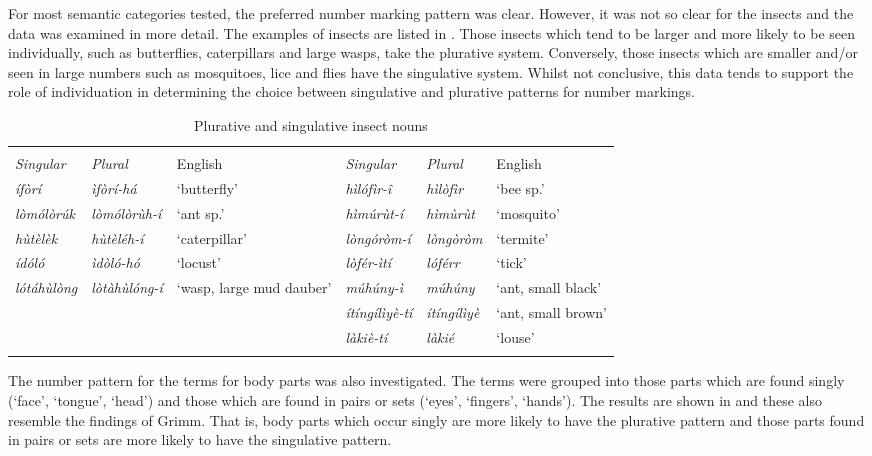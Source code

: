 \documentclass[output=paper]{langsci/langscibook}
\begin{document}
For most semantic categories tested, the preferred number marking pattern was clear. However, it was not so clear for the insects and the data was examined in more detail. The examples of insects are listed in . Those insects which tend to be larger and more likely to be seen individually, such as butterflies, caterpillars and large wasps, take the plurative system. Conversely, those insects which are smaller and/or seen in large numbers such as mosquitoes, lice and flies have the singulative system. Whilst not conclusive, this data tends to support the role of individuation in determining the choice between singulative and plurative patterns for number markings.

\begin{table}
\begin{tabularx}{\textwidth}{>{\itshape}l>{\itshape}lQ>{\itshape}l>{\itshape}lQ}
\lsptoprule

 & \\ \cmidrule(lr){1-3}\cmidrule(lr){4-6}
  \textup{Singular} &  \textup{Plural} &  {English} &  \textup{Singular} &  \textup{Plural} &  {English}\\
\midrule
 ífòrí &  ìfòrí-há & ‘butterfly’ &  hìlófìr-î &  hìlòfìr & ‘bee sp.’\\
\tablevspace
 lòmólòrúk &  lòmólòrùh-í & ‘ant sp.’ &  hìmúrùt-í &  hìmùrùt & ‘mosquito’\\
\tablevspace
 hùtèlèk &  hùtèléh-í & ‘caterpillar’ &  lòngóròm-í &  lòngòròm & ‘termite’\\
\tablevspace
 ídóló &  ìdòló-hó & ‘locust’ &  lòfér-ìtí &  lóférr & ‘tick’\\
\tablevspace
 lótáhùlòng &  lòtàhùlóng-í & ‘wasp, large mud dauber’ &  múhúny-ì &  múhúny & ‘ant, small black’\\
\tablevspace
&  &  &  ítíngílìyè-tí &  ítíngílìyè & ‘ant, small brown’\\
\tablevspace
&  &  &  làkiè-tí &  làkié & ‘louse’\\
\lspbottomrule
\end{tabularx}
\caption{Plurative and singulative insect nouns}
\label{tab:moodie:7}
\end{table}

The number pattern for the terms for body parts was also investigated. The terms were grouped into those parts which are found singly (‘face’, ‘tongue’, ‘head’) and those which are found in pairs or sets (‘eyes’, ‘fingers’, ‘hands’). The results are shown in  and these also resemble the findings of Grimm.  That is, body parts which occur singly are more likely to have the plurative pattern and those parts found in pairs or sets are more likely to have the singulative pattern. 
\end{document}
